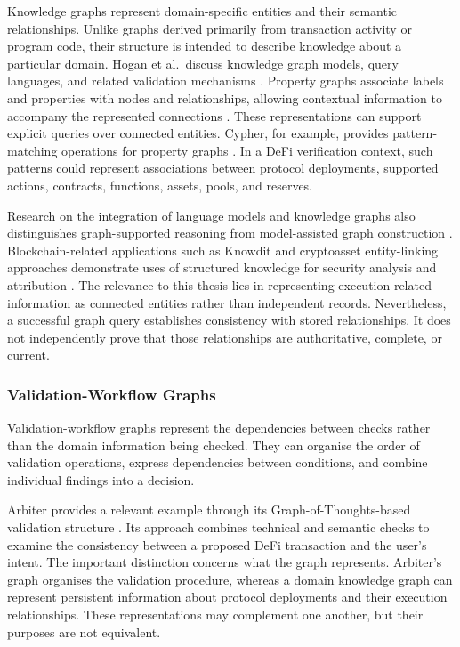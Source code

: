 Knowledge graphs represent domain-specific entities and
their semantic relationships. Unlike graphs derived
primarily from transaction activity or program code,
their structure is intended to describe knowledge about
a particular domain. Hogan et al.\ discuss knowledge
graph models, query languages, and related validation
mechanisms \cite{hoganKnowledgeGraphs2021}.
Property graphs associate labels and properties with
nodes and relationships, allowing contextual information
to accompany the represented connections
\cite{anglesPropertyGraphModel2018}. These representations can support explicit queries over
connected entities. Cypher, for example, provides
pattern-matching operations for property graphs
\cite{francisCypher2018}. In a DeFi verification context,
such patterns could represent associations between
protocol deployments, supported actions, contracts,
functions, assets, pools, and reserves.

Research on the integration of language models and
knowledge graphs also distinguishes graph-supported
reasoning from model-assisted graph construction
\cite{panUnifyingLargeLanguage2023}.
Blockchain-related applications such as Knowdit and
cryptoasset entity-linking approaches demonstrate uses
of structured knowledge for security analysis and
attribution
\cite{TODO_Knowdit,TODO_CryptoassetEntityLinking}. The relevance to this thesis lies in representing
execution-related information as connected entities
rather than independent records. Nevertheless, a
successful graph query establishes consistency with
stored relationships. It does not independently prove
that those relationships are authoritative, complete,
or current.

\subsubsection{Validation-Workflow Graphs}

Validation-workflow graphs represent the dependencies
between checks rather than the domain information
being checked. They can organise the order of validation
operations, express dependencies between conditions,
and combine individual findings into a decision.

Arbiter provides a relevant example through its
Graph-of-Thoughts-based validation structure
\cite{TODO_Arbiter2026}. Its approach combines
technical and semantic checks to examine the
consistency between a proposed DeFi transaction
and the user's intent. The important distinction concerns what the graph
represents. Arbiter's graph organises the validation
procedure, whereas a domain knowledge graph can
represent persistent information about protocol
deployments and their execution relationships.
These representations may complement one another,
but their purposes are not equivalent.


